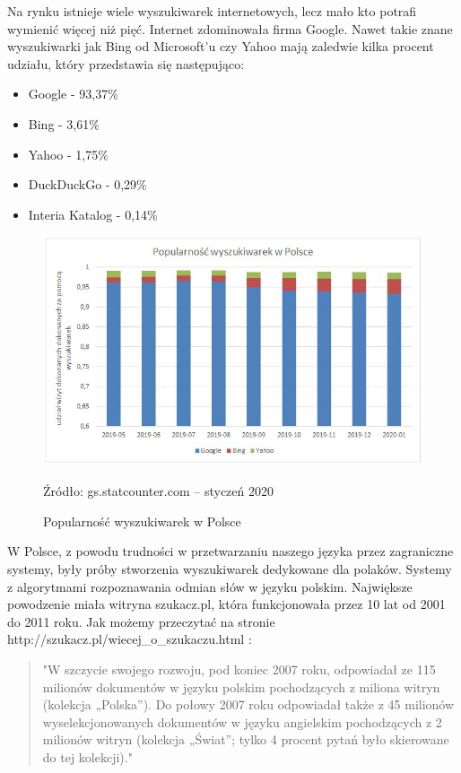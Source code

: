 \documentclass[licencjacka]{pracadypl}
\theoremstyle{definition}
\begin{document}
Na rynku istnieje wiele wyszukiwarek internetowych, lecz mało kto potrafi wymienić więcej niż pięć.
Internet zdominowała firma Google. Nawet takie znane wyszukiwarki jak Bing od Microsoft'u czy Yahoo mają zaledwie kilka procent udziału, który przedstawia się następująco:
\begin{itemize}
	\item Google - 93,37\%
	\item Bing - 3,61\%
	\item Yahoo - 1,75\%
	\item DuckDuckGo - 0,29\%
	\item Interia Katalog - 0,14\%
\end{itemize}
\begin{figure}[H]
	\centering
	\includegraphics[width=1\linewidth]{"img/popularnosc wyszukiwarek w polsce"}
	\caption{Popularność wyszukiwarek w Polsce}
	\label{fig:popularnosc-wyszukiwarek-w-polsce}
	Źródło: gs.statcounter.com – styczeń 2020
\end{figure}


W Polsce, z powodu trudności w przetwarzaniu naszego języka przez zagraniczne systemy, były próby stworzenia wyszukiwarek dedykowane dla polaków. Systemy z algorytmami rozpoznawania odmian słów w języku polskim. Największe powodzenie miała witryna szukacz.pl, która funkcjonowała przez 10 lat od 2001 do 2011 roku. Jak możemy przeczytać na stronie http://szukacz.pl/wiecej\_o\_szukaczu.html \cite{szukacz}: 

\begin{quote}
	"W szczycie swojego rozwoju, pod koniec 2007 roku, odpowiadał ze 115 milionów dokumentów w języku polskim pochodzących z miliona witryn (kolekcja „Polska”). Do połowy 2007 roku odpowiadał także z 45 milionów wyselekcjonowanych dokumentów w języku angielskim pochodzących z 2 milionów witryn (kolekcja „Świat”; tylko 4 procent pytań było skierowane do tej kolekcji)."
\end{quote}
\end{document}
